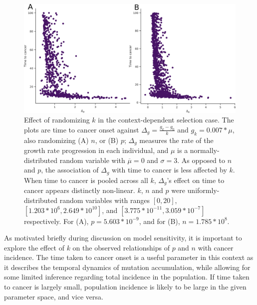 \documentclass[10pt,twocolumn,twoside]{article}
\begin{document}
		\begin{figure}[tbhp]
			\centering
			\includegraphics[width=\linewidth, keepaspectratio=true]{figS2-2.png}
			\caption{Effect of randomizing $k$ in the context-dependent selection case. The plots are time to cancer onset against $\Delta_{g} = \frac{g_{k}-g_{0}}{k}$ and $g_{k} = 0.007*\mu$, also randomizing (A) $n$, or (B) $p$; $\Delta_{g}$ measures the rate of the growth rate progression in each individual, and $\mu$ is a normally-distributed random variable with $\overline{\mu}=0$ and $\sigma=3$. As opposed to $n$ and $p$, the association of $\Delta_{g}$ with time to cancer is less affected by $k$. When time to cancer is pooled across all $k$, $\Delta_{g}$'s effect on time to cancer appears distinctly non-linear. $k$, $n$ and $p$ were uniformly-distributed random variables with ranges $[0, 20]$, $[1.203*10^{6}, 2.649*10^{10}]$, and $[3.775*10^{-11}, 3.059*10^{-7}]$ respectively. For (A), $p=5.603*10^{-9}$, and for (B), $n=1.785*10^{8}$.}
			\label{figS2.2}
		\end{figure}

		As motivated briefly during discussion on model sensitivity, it is important to explore the effect of $k$ on the observed relationships of $p$ and $n$ with cancer incidence. The time taken to cancer onset is a useful parameter in this context as it describes the temporal dynamics of mutation accumulation, while allowing for some limited inference regarding total incidence in the population. If time taken to cancer is largely small, population incidence is likely to be large in the given parameter space, and vice versa.
\end{document}
